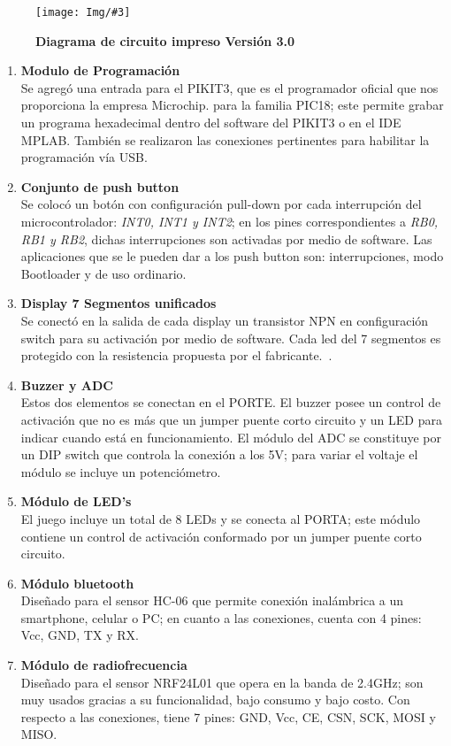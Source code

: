 \documentclass[times, 10pt,twocolumn]{article}
\newcommand{\Img}[5]{
   \begin{figure}[H]
   	   \centering
       \texttt{[image: Img/\#3]}
       \caption{ \centering \textbf{\small #4}}
       \label{#5}
   
       \end{figure}
   }
\begin{document}
\Img{7.5cm}{7.0cm}{tercera_version_pcb}{Diagrama de circuito impreso Versión 3.0}{fig:10}
\begin{enumerate}[label=\emph{\Alph*.}] 
  \item \textbf{Modulo de Programación}\\ Se agregó una entrada para el PIKIT3, que es el programador oficial que nos proporciona la empresa Microchip. para la familia PIC18; este permite grabar un programa hexadecimal dentro del software del PIKIT3 o en el IDE MPLAB. También se realizaron las conexiones pertinentes para habilitar la  programación vía USB.
 
  \item \textbf{Conjunto de push button}\\ Se colocó un botón con configuración pull-down por cada interrupción del microcontrolador: \textit{INT0, INT1 y INT2}; en los pines correspondientes a \textit{RB0, RB1 y RB2}, dichas interrupciones son activadas por medio de software.   
Las aplicaciones que se le pueden dar a los push button son: interrupciones, modo Bootloader y de uso ordinario.
  \item \textbf{Display 7 Segmentos unificados}\\ Se conectó en la salida de cada display un transistor NPN en configuración switch para su activación por medio de software. Cada led del 7 segmentos es protegido con la resistencia propuesta por el fabricante.~\cite{ex4}.
  \item \textbf{Buzzer y ADC}\\ Estos dos elementos se conectan en el PORTE. El buzzer posee un control de activación que no es más que un jumper puente corto circuito y un LED para indicar cuando está en funcionamiento. El módulo del ADC se constituye por un DIP switch que controla la conexión a los 5V; para variar el voltaje el módulo se incluye un potenciómetro.
  \item \textbf{Módulo de LED's}\\ El juego incluye un total de 8 LEDs y se conecta al   PORTA; este módulo contiene un control de activación conformado por un jumper puente corto circuito.
  \item \textbf{Módulo bluetooth}\\ Diseñado para el sensor HC-06 que permite conexión inalámbrica a un smartphone, celular o PC; en cuanto a las conexiones, cuenta con 4 pines: Vcc, GND, TX y RX.
  \item \textbf{Módulo de radiofrecuencia}\\ Diseñado para el sensor NRF24L01 que opera en la banda de 2.4GHz; son muy usados gracias a su funcionalidad, bajo consumo y bajo costo. Con respecto a las conexiones, tiene 7 pines: GND, Vcc, CE, CSN, SCK, MOSI y MISO.

\end{enumerate}
\end{document}
